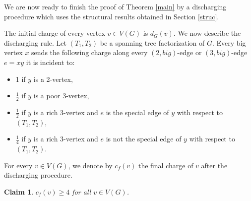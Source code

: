 \documentclass{article}
\theoremstyle{plain}
\newtheorem{Claim}{Claim}
\theoremstyle{nonumberplain}
\theoremstyle{nonumberplain}
\newcommand{\stf}{spanning tree factorization }
\begin{document}
We are now ready to finish the proof of Theorem \ref{main} by a discharging procedure which uses the structural results obtained in Section \ref{struc}.


The initial charge of every vertex $v \in V(G)$ is $d_G(v)$. We now describe the discharging rule. Let $(T_1,T_2)$ be a \stf  of $G$. Every big vertex $x$ sends the following charge along every $(2,big)$-edge or $(3,big)$-edge $e=xy$ it is incident to:
\begin{itemize}
\item 1 if $y$ is a 2-vertex,
\item $\frac{1}{2}$ if $y$ is a poor 3-vertex,
\item $\frac{1}{2}$ if $y$ is a rich 3-vertex and $e$ is the special edge of $y$ with respect to $(T_1,T_2)$,
\item $\frac{1}{4}$ if $y$ is a rich 3-vertex and $e$ is not the special edge of $y$ with respect to $(T_1,T_2)$.
\end{itemize}
For every $v \in V(G)$, we denote by $c_f(v)$ the final charge of $v$ after the discharging procedure.
\begin{Claim}
$c_f(v)\geq 4$ for all $v \in V(G)$.
\end{Claim}
\end{document}

